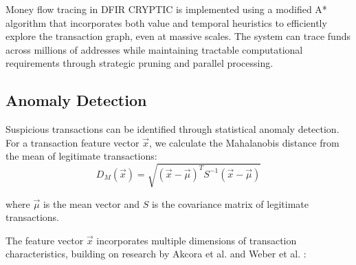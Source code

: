 \documentclass[conference]{IEEEtran}
\begin{document}
Money flow tracing in DFIR CRYPTIC is implemented using a modified A* algorithm that incorporates both value and temporal heuristics to efficiently explore the transaction graph, even at massive scales. The system can trace funds across millions of addresses while maintaining tractable computational requirements through strategic pruning and parallel processing.

\subsection{Anomaly Detection}

Suspicious transactions can be identified through statistical anomaly detection. For a transaction feature vector $\vec{x}$, we calculate the Mahalanobis distance from the mean of legitimate transactions:
\begin{equation}
D_M(\vec{x}) = \sqrt{(\vec{x} - \vec{\mu})^T S^{-1} (\vec{x} - \vec{\mu})}
\end{equation}

where $\vec{\mu}$ is the mean vector and $S$ is the covariance matrix of legitimate transactions.

The feature vector $\vec{x}$ incorporates multiple dimensions of transaction characteristics, building on research by Akcora et al. \cite{akcora2020} and Weber et al. \cite{weber2019}:
\end{document}

